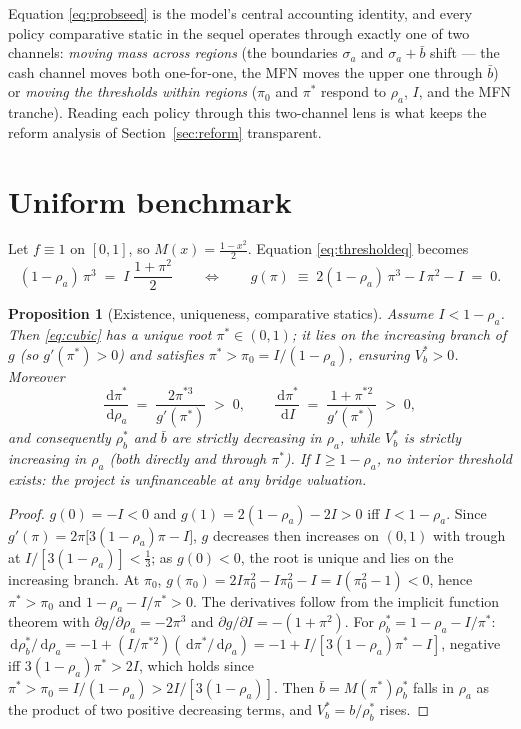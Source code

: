 \documentclass[11pt]{article}
\newtheorem{proposition}{Proposition}
\theoremstyle{definition}
\newcommand{\dd}{\,\mathrm{d}}
\begin{document}
Equation \eqref{eq:probseed} is the model's central accounting identity, and every policy comparative static in the sequel operates through exactly one of two channels: \emph{moving mass across regions} (the boundaries $\sigma_a$ and $\sigma_a+\bar b$ shift --- the cash channel moves both one-for-one, the MFN moves the upper one through $\bar b$) or \emph{moving the thresholds within regions} ($\pi_0$ and $\pi^{*}$ respond to $\rho_a$, $I$, and the MFN tranche). Reading each policy through this two-channel lens is what keeps the reform analysis of Section~\ref{sec:reform} transparent.

\section{Uniform benchmark}\label{sec:uniform}

Let $f \equiv 1$ on $[0,1]$, so $M(x) = \tfrac{1-x^2}{2}$. Equation \eqref{eq:thresholdeq} becomes
\begin{equation}
(1-\rho_a)\,\pi^{3} \;=\; I\;\frac{1+\pi^{2}}{2}
\qquad\Longleftrightarrow\qquad
g(\pi) \;\equiv\; 2(1-\rho_a)\,\pi^{3} - I\,\pi^{2} - I \;=\; 0 .
\label{eq:cubic}
\end{equation}

\begin{proposition}[Existence, uniqueness, comparative statics]\label{prop:uniform}
Assume $I < 1-\rho_a$. Then \eqref{eq:cubic} has a unique root $\pi^{*} \in (0,1)$; it lies on the increasing branch of $g$ (so $g'(\pi^{*})>0$) and satisfies $\pi^{*} > \pi_0 = I/(1-\rho_a)$, ensuring $V_b^{*} > 0$. Moreover
\[
\frac{\dd \pi^{*}}{\dd \rho_a} \;=\; \frac{2\pi^{*3}}{g'(\pi^{*})} \;>\;0,
\qquad
\frac{\dd \pi^{*}}{\dd I} \;=\; \frac{1+\pi^{*2}}{g'(\pi^{*})} \;>\;0,
\]
and consequently $\rho_b^{*}$ and $\bar b$ are strictly decreasing in $\rho_a$, while $V_b^{*}$ is strictly increasing in $\rho_a$ (both directly and through $\pi^{*}$). If $I \ge 1-\rho_a$, no interior threshold exists: the project is unfinanceable at any bridge valuation.
\end{proposition}

\begin{proof}
$g(0) = -I <0$ and $g(1) = 2(1-\rho_a) - 2I > 0$ iff $I<1-\rho_a$. Since $g'(\pi) = 2\pi\bigl[3(1-\rho_a)\pi - I\bigr]$, $g$ decreases then increases on $(0,1)$ with trough at $I/[3(1-\rho_a)]<\tfrac13$; as $g(0)<0$, the root is unique and lies on the increasing branch. At $\pi_0$, $g(\pi_0) = 2I\pi_0^2 - I\pi_0^2 - I = I(\pi_0^{2}-1)<0$, hence $\pi^{*}>\pi_0$ and $1-\rho_a-I/\pi^{*}>0$. The derivatives follow from the implicit function theorem with $\partial g/\partial \rho_a = -2\pi^{3}$ and $\partial g/\partial I = -(1+\pi^{2})$. For $\rho_b^{*} = 1-\rho_a - I/\pi^{*}$: $\dd\rho_b^{*}/\dd\rho_a = -1 + (I/\pi^{*2})(\dd\pi^{*}/\dd\rho_a) = -1 + I\big/[3(1-\rho_a)\pi^{*}-I]$, negative iff $3(1-\rho_a)\pi^{*} > 2I$, which holds since $\pi^{*}>\pi_0 = I/(1-\rho_a) > 2I/[3(1-\rho_a)]$. Then $\bar b = M(\pi^{*})\rho_b^{*}$ falls in $\rho_a$ as the product of two positive decreasing terms, and $V_b^{*} = b/\rho_b^{*}$ rises.
\end{proof}
\end{document}
